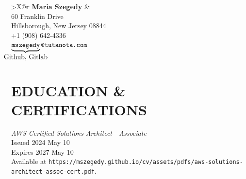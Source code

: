 \documentclass{article}
\begin{document}

\begin{tabularx}{\textwidth}{>{\centering\arraybackslash}X@{}r}
  {\large\bf Maria Szegedy} &
   \\[0.6em]\vspace{0em}
  {60 Franklin Drive} \\
  {Hillsborough, New Jersey 08844} \\
  {+1 (908) 642-4336} \\
  {\fontsize{12}{12}%
    $\underbrace{\texttt{mszegedy}}%
    _{\textstyle\text{\makebox[0pt]{\fontsize{10}{10}\selectfont Github, Gitlab}}}%
    \texttt{@tutanota.com}$
  }
\end{tabularx}



\section*{EDUCATION \& CERTIFICATIONS}

{\it AWS Certified Solutions Architect---Associate} \\
\hspace*{3em} Issued 2024 May 10 \\
\hspace*{3em} Expires 2027 May 10 \\
{\fontsize{9}{10}\selectfont
  Available at
  \texttt{https://mszegedy.github.io/cv/assets/pdfs/aws-solutions-architect-assoc-cert.pdf}.}
\end{document}
